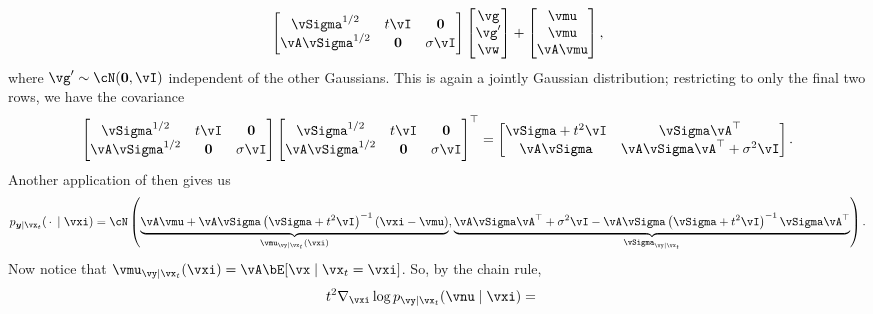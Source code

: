 \documentclass[../../book-main.tex]{subfiles}
\begin{document}
\begin{example}
\begin{equation}
\begin{bmatrix}
      \vSigma^{1/2} & t\vI & \Zero \\
      \vA \vSigma^{1/2} & \Zero & \sigma \vI
    \end{bmatrix}
    \begin{bmatrix}
      \vg \\
      \vg' \\
      \vw
    \end{bmatrix}
    +
    \begin{bmatrix}
      \vmu \\
      \vmu \\
      \vA\vmu
    \end{bmatrix},
  \end{equation}
  where $\vg' \sim \cN(\Zero, \vI)$ independent of the other Gaussians.
  This is again a jointly Gaussian distribution; restricting to only the final
  two rows, we have the covariance
  \begin{equation*}
    \begin{bmatrix}
      \vSigma^{1/2} & t\vI & \Zero \\
      \vA \vSigma^{1/2} & \Zero & \sigma \vI
    \end{bmatrix}
    \begin{bmatrix}
      \vSigma^{1/2} & t\vI & \Zero \\
      \vA \vSigma^{1/2} & \Zero & \sigma \vI
    \end{bmatrix}^\top
    =
    \begin{bmatrix}
      \vSigma + t^2\vI & \vSigma\vA^\top \\
      \vA\vSigma & \vA\vSigma\vA^\top + \sigma^2 \vI
    \end{bmatrix}.
  \end{equation*}
  Another application of  then gives us
  \begin{equation}
    p_{\y \mid \vx_t}(\spcdot \mid \vxi) = \cN\left(
    \underbrace{%
      \vA\vmu + \vA\vSigma\left( \vSigma + t^2 \vI \right)^{-1}
      \left(
        \vxi - \vmu
      \right)
      }_{\vmu_{\vy \mid \vx_t}(\vxi)},
      \underbrace{%
        \vA\vSigma\vA^\top + \sigma^2 \vI - \vA\vSigma \left( \vSigma
        + t^2 \vI\right)^{-1} \vSigma \vA^\top
      }_{\vSigma_{\vy\mid \vx_t}}
    \right).
  \end{equation}
  Now notice that $\vmu_{\vy \mid \vx_t}(\vxi) = \vA \bE[\vx \mid \vx_t=\vxi]$.
  So, by the chain rule,
  \begin{align*}
    t^2 \nabla_{\vxi} \log p_{\vy \mid \vx_t}(\vnu \mid \vxi)
    &=

\end{align*}
\end{example}
\end{document}

